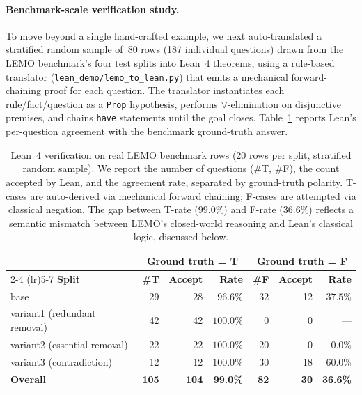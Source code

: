 \documentclass{article} %
\begin{document}
\paragraph{Benchmark-scale verification study.}
To move beyond a single hand-crafted example, we next auto-translated a
stratified random sample of~80 rows (187 individual questions) drawn from the
LEMO benchmark's four test splits into Lean~4 theorems, using a rule-based
translator (\texttt{lean\_demo/lemo\_to\_lean.py}) that emits a mechanical
forward-chaining proof for each question. The translator instantiates each
rule/fact/question as a \texttt{Prop} hypothesis, performs $\lor$-elimination
on disjunctive premises, and chains \texttt{have} statements until the goal
closes. Table~\ref{tab:lean_bench} reports Lean's per-question agreement with
the benchmark ground-truth answer.

\begin{table}[h]
\centering
\small
\caption{Lean~4 verification on real LEMO benchmark rows (20 rows per split,
stratified random sample). We report the number of questions (\#T, \#F), the
count accepted by Lean, and the agreement rate, separated by ground-truth
polarity. T-cases are auto-derived via mechanical forward chaining; F-cases
are attempted via classical negation. The gap between T-rate ($99.0\%$) and
F-rate ($36.6\%$) reflects a semantic mismatch between LEMO's closed-world
reasoning and Lean's classical logic, discussed below.}
\label{tab:lean_bench}
\begin{tabular}{lrrrrrr}
\toprule
& \multicolumn{3}{c}{\textbf{Ground truth = T}} & \multicolumn{3}{c}{\textbf{Ground truth = F}} \\
\cmidrule(lr){2-4} \cmidrule(lr){5-7}
\textbf{Split} & \textbf{\#T} & \textbf{Accept} & \textbf{Rate} & \textbf{\#F} & \textbf{Accept} & \textbf{Rate} \\
\midrule
base                         & 29  & 28  & $96.6\%$ & 32  & 12 & $37.5\%$ \\
variant1 (redundant removal) & 42  & 42  & $100.0\%$ & 0   & 0  & --- \\
variant2 (essential removal) & 22  & 22  & $100.0\%$ & 20  & 0  & $0.0\%$ \\
variant3 (contradiction)     & 12  & 12  & $100.0\%$ & 30  & 18 & $60.0\%$ \\
\midrule
\textbf{Overall}             & \textbf{105} & \textbf{104} & \textbf{99.0\%} & \textbf{82} & \textbf{30} & \textbf{36.6\%} \\
\bottomrule
\end{tabular}
\end{table}
\end{document}
